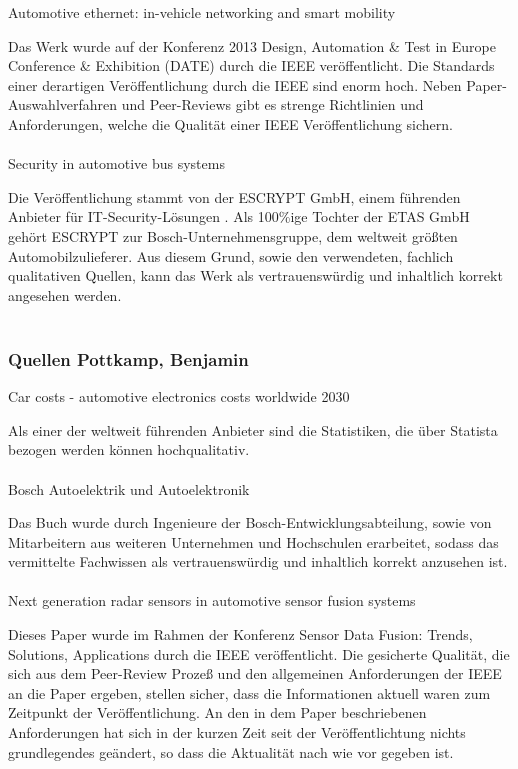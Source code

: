 Automotive ethernet: in-vehicle networking and smart mobility \cite{hank2013automotive}

Das Werk wurde auf der Konferenz 2013 Design, Automation \& Test in Europe Conference \& Exhibition (DATE) durch die IEEE veröffentlicht. Die Standards einer derartigen Veröffentlichung durch die IEEE sind enorm hoch. Neben Paper-Auswahlverfahren und Peer-Reviews gibt es strenge Richtlinien und Anforderungen, welche die Qualität einer IEEE Veröffentlichung sichern.\\\\

Security in automotive bus systems \cite{wolf2004security}

Die Veröffentlichung stammt von der ESCRYPT GmbH, einem führenden Anbieter für IT-Security-Lösungen . Als 100\%ige Tochter der ETAS GmbH gehört ESCRYPT zur Bosch-Unternehmensgruppe, dem weltweit größten Automobilzulieferer. Aus diesem Grund, sowie den verwendeten, fachlich qualitativen Quellen, kann das Werk als vertrauenswürdig und inhaltlich korrekt angesehen werden.\\\\


\subsubsection{Quellen Pottkamp, Benjamin}

Car costs - automotive electronics costs worldwide 2030 \cite{BP02}

Als einer der weltweit führenden Anbieter sind die Statistiken, die über Statista bezogen werden können hochqualitativ.\\\\

Bosch Autoelektrik und Autoelektronik \cite{reif2011bosch}

Das Buch wurde durch Ingenieure der Bosch-Entwicklungsabteilung, sowie von Mitarbeitern aus weiteren Unternehmen und Hochschulen erarbeitet, sodass das vermittelte Fachwissen als vertrauenswürdig und inhaltlich korrekt anzusehen ist.\\\\

Next generation radar sensors in automotive sensor fusion systems \cite{BP06}

Dieses Paper wurde im Rahmen der Konferenz Sensor Data Fusion: Trends, Solutions, Applications durch die IEEE veröffentlicht. Die gesicherte Qualität,
die sich aus dem Peer-Review Prozeß und den allgemeinen Anforderungen der IEEE an die Paper ergeben, stellen sicher, dass die Informationen
aktuell waren zum Zeitpunkt der Veröffentlichung. An den in dem Paper beschriebenen  Anforderungen hat sich in der kurzen Zeit seit der Veröffentlichtung nichts grundlegendes
geändert, so dass die Aktualität nach wie vor gegeben ist.\\\\

